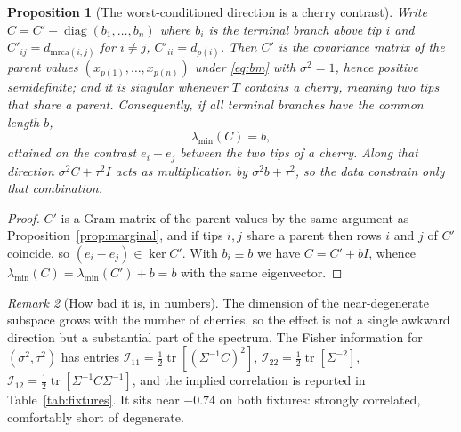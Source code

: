 \documentclass[11pt]{article}
\newtheorem{proposition}{Proposition}
\theoremstyle{remark}
\newtheorem{remark}[proposition]{Remark}
\begin{document}
\begin{proposition}[The worst-conditioned direction is a cherry contrast]
\label{prop:cherry}
Write $C = C' + \operatorname{diag}(b_1,\dots,b_n)$ where $b_i$ is the terminal branch above tip $i$
and $C'_{ij} = d_{\mathrm{mrca}(i,j)}$ for $i \neq j$, $C'_{ii} = d_{p(i)}$. Then $C'$ is the
covariance matrix of the parent values $(x_{p(1)},\dots,x_{p(n)})$ under \eqref{eq:bm} with
$\sigma^2 = 1$, hence positive semidefinite; and it is singular whenever $T$ contains a
\emph{cherry}, meaning two tips that share a parent. Consequently, if all terminal branches have
the common length $b$,
\begin{equation}
  \lambda_{\min}(C) = b,
\end{equation}
attained on the contrast $e_i - e_j$ between the two tips of a cherry. Along that direction
$\sigma^2 C + \tau^2 I$ acts as multiplication by $\sigma^2 b + \tau^2$, so the data constrain only
that combination.
\end{proposition}

\begin{proof}
$C'$ is a Gram matrix of the parent values by the same argument as
Proposition~\ref{prop:marginal}, and if tips $i,j$ share a parent then rows $i$ and $j$ of $C'$
coincide, so $(e_i - e_j) \in \ker C'$. With $b_i \equiv b$ we have $C = C' + bI$, whence
$\lambda_{\min}(C) = \lambda_{\min}(C') + b = b$ with the same eigenvector.
\end{proof}

\begin{remark}[How bad it is, in numbers]
The dimension of the near-degenerate subspace grows with the number of cherries, so the effect is not
a single awkward direction but a substantial part of the spectrum. The Fisher information for
$(\sigma^2,\tau^2)$ has entries
$\mathcal{I}_{11} = \tfrac12\operatorname{tr}[(\Sigma^{-1}C)^2]$,
$\mathcal{I}_{22} = \tfrac12\operatorname{tr}[\Sigma^{-2}]$,
$\mathcal{I}_{12} = \tfrac12\operatorname{tr}[\Sigma^{-1}C\Sigma^{-1}]$,
and the implied correlation is reported in Table~\ref{tab:fixtures}. It sits near $-0.74$ on both
fixtures: strongly correlated, comfortably short of degenerate.
\end{remark}
\end{document}
